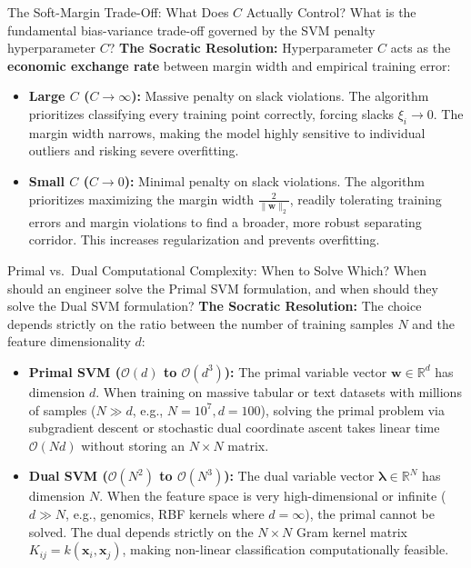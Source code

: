 \begin{ponderbox}{The Soft-Margin Trade-Off: What Does $C$ Actually Control?}
What is the fundamental bias-variance trade-off governed by the SVM penalty hyperparameter $C$?
\tcblower
\textbf{The Socratic Resolution:} Hyperparameter $C$ acts as the \textbf{economic exchange rate} between margin width and empirical training error:
\begin{itemize}
    \item \textbf{Large $C$ ($C \to \infty$):} Massive penalty on slack violations. The algorithm prioritizes classifying every training point correctly, forcing slacks $\xi_i \to 0$. The margin width narrows, making the model highly sensitive to individual outliers and risking severe overfitting.
    \item \textbf{Small $C$ ($C \to 0$):} Minimal penalty on slack violations. The algorithm prioritizes maximizing the margin width $\frac{2}{\|\mathbf{w}\|_2}$, readily tolerating training errors and margin violations to find a broader, more robust separating corridor. This increases regularization and prevents overfitting.
\end{itemize}
\end{ponderbox}

\begin{ponderbox}{Primal vs.\ Dual Computational Complexity: When to Solve Which?}
When should an engineer solve the Primal SVM formulation, and when should they solve the Dual SVM formulation?
\tcblower
\textbf{The Socratic Resolution:} The choice depends strictly on the ratio between the number of training samples $N$ and the feature dimensionality $d$:
\begin{itemize}
    \item \textbf{Primal SVM ($\mathcal{O}(d)$ to $\mathcal{O}(d^3)$):} The primal variable vector $\mathbf{w} \in \mathbb{R}^d$ has dimension $d$. When training on massive tabular or text datasets with millions of samples ($N \gg d$, e.g., $N = 10^7, d = 100$), solving the primal problem via subgradient descent or stochastic dual coordinate ascent takes linear time $\mathcal{O}(N d)$ without storing an $N \times N$ matrix.
    \item \textbf{Dual SVM ($\mathcal{O}(N^2)$ to $\mathcal{O}(N^3)$):} The dual variable vector $\boldsymbol{\lambda} \in \mathbb{R}^N$ has dimension $N$. When the feature space is very high-dimensional or infinite ($d \gg N$, e.g., genomics, RBF kernels where $d = \infty$), the primal cannot be solved. The dual depends strictly on the $N \times N$ Gram kernel matrix $K_{ij} = k(\mathbf{x}_i, \mathbf{x}_j)$, making non-linear classification computationally feasible.
\end{itemize}
\end{ponderbox}

